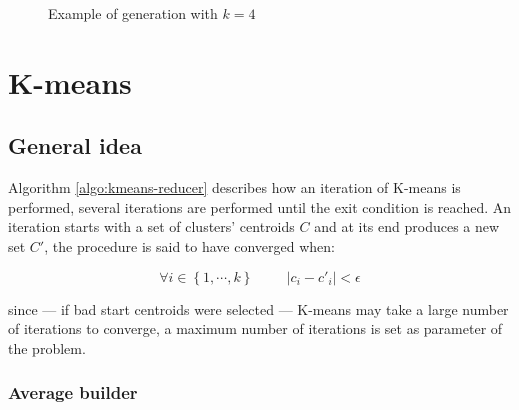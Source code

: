 \documentclass[parskip=full]{report}
\begin{document}
\begin{figure}[H]
	\centering
	\caption{Example of generation with $k=4$}
	\label{fig:cluster-example}
\end{figure}

\chapter{K-means}

\section{General idea}

Algorithm \ref{algo:kmeans-reducer} describes how an iteration of K-means is 
performed, 
several iterations are performed until the exit condition is reached. An 
iteration starts with a set of clusters' centroids $C$ and at its end produces 
a new set $C'$, the procedure is said to have converged when:

\begin{equation}
	\forall i \in \left\{1, \cdots, k\right\} \hspace{1cm} |c_i - {c'}_i| < 
	\epsilon
\end{equation}

since --- if bad start centroids were selected --- K-means may take a large 
number of 
iterations to converge, a maximum number of iterations is set as parameter of 
the problem.

\subsection{Average builder}
\label{avgBuild}
\end{document}
